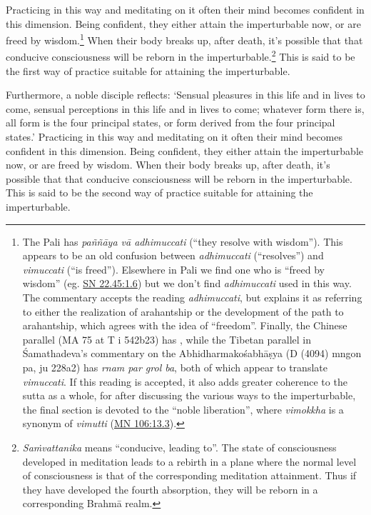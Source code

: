 \documentclass[12pt,openany]{book}%
\newcommand*{\langlzh}[1]{\cjk{#1}\normalfont}%
\begin{document}
Practicing in this way and meditating on it often their mind becomes confident in this dimension. Being confident, they either attain the imperturbable now, or are freed by wisdom.\footnote{The Pali has \textit{\textsanskrit{paññāya} \textsanskrit{vā} adhimuccati} (“they resolve with wisdom”). This appears to be an old confusion between \textit{adhimuccati} (“resolves”) and \textit{vimuccati} (“is freed”). Elsewhere in Pali we find one who is “freed by wisdom” (eg. \href{https://suttacentral.net/sn22.45/en/sujato\#1.6}{SN 22.45:1.6}) but we don’t find \textit{adhimuccati} used in this way. The commentary accepts the reading \textit{adhimuccati}, but explains it as referring to either the realization of arahantship or the development of the path to arahantship, which agrees with the idea of “freedom”. Finally, the Chinese parallel (MA 75 at T i 542b23) has \langlzh{解}, while the Tibetan parallel in Śamathadeva’s commentary on the \textsanskrit{Abhidharmakośabhāṣya} (D (4094) mngon pa, ju 228a2) has \textit{rnam par grol ba}, both of which appear to translate \textit{vimuccati}. If this reading is accepted, it also adds greater coherence to the sutta as a whole, for after discussing the various ways to the imperturbable, the final section is devoted to the “noble liberation”, where \textit{vimokkha} is a synonym of \textit{vimutti} (\href{https://suttacentral.net/mn106/en/sujato\#13.3}{MN 106:13.3}). } When their body breaks up, after death, it’s possible that that conducive consciousness will be reborn in the imperturbable.\footnote{\textit{\textsanskrit{Saṁvattanika}} means “conducive, leading to”. The 
 state of consciousness developed in meditation leads to a rebirth in a plane where the normal level of consciousness is that of the corresponding meditation attainment. Thus if they have developed the fourth absorption, they will be reborn in a corresponding \textsanskrit{Brahmā} realm. } This is said to be the first way of practice suitable for attaining the imperturbable. 

Furthermore, a noble disciple reflects: ‘Sensual pleasures in this life and in lives to come, sensual perceptions in this life and in lives to come; whatever form there is, all form is the four principal states, or form derived from the four principal states.’ Practicing in this way and meditating on it often their mind becomes confident in this dimension. Being confident, they either attain the imperturbable now, or are freed by wisdom. When their body breaks up, after death, it’s possible that that conducive consciousness will be reborn in the imperturbable. This is said to be the second way of practice suitable for attaining the imperturbable. 
\end{document}
